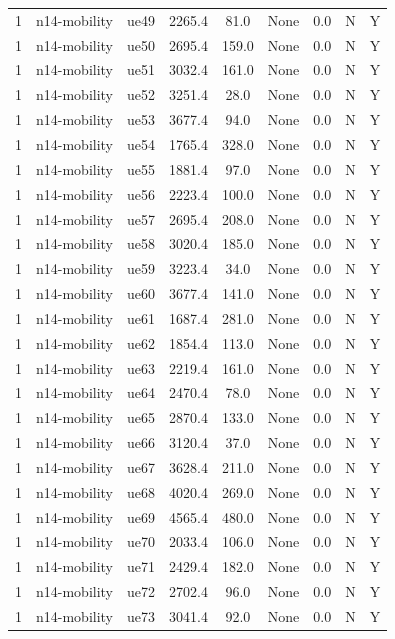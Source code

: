 \begin{table}[ht]
\begin{tabular}{|c|c|c|c|c|c|c|c|c|}
1 & n14-mobility & ue49 & 2265.4 & 81.0 & None & 0.0 & N & Y \\
1 & n14-mobility & ue50 & 2695.4 & 159.0 & None & 0.0 & N & Y \\
1 & n14-mobility & ue51 & 3032.4 & 161.0 & None & 0.0 & N & Y \\
1 & n14-mobility & ue52 & 3251.4 & 28.0 & None & 0.0 & N & Y \\
1 & n14-mobility & ue53 & 3677.4 & 94.0 & None & 0.0 & N & Y \\
1 & n14-mobility & ue54 & 1765.4 & 328.0 & None & 0.0 & N & Y \\
1 & n14-mobility & ue55 & 1881.4 & 97.0 & None & 0.0 & N & Y \\
1 & n14-mobility & ue56 & 2223.4 & 100.0 & None & 0.0 & N & Y \\
1 & n14-mobility & ue57 & 2695.4 & 208.0 & None & 0.0 & N & Y \\
1 & n14-mobility & ue58 & 3020.4 & 185.0 & None & 0.0 & N & Y \\
1 & n14-mobility & ue59 & 3223.4 & 34.0 & None & 0.0 & N & Y \\
1 & n14-mobility & ue60 & 3677.4 & 141.0 & None & 0.0 & N & Y \\
1 & n14-mobility & ue61 & 1687.4 & 281.0 & None & 0.0 & N & Y \\
1 & n14-mobility & ue62 & 1854.4 & 113.0 & None & 0.0 & N & Y \\
1 & n14-mobility & ue63 & 2219.4 & 161.0 & None & 0.0 & N & Y \\
1 & n14-mobility & ue64 & 2470.4 & 78.0 & None & 0.0 & N & Y \\
1 & n14-mobility & ue65 & 2870.4 & 133.0 & None & 0.0 & N & Y \\
1 & n14-mobility & ue66 & 3120.4 & 37.0 & None & 0.0 & N & Y \\
1 & n14-mobility & ue67 & 3628.4 & 211.0 & None & 0.0 & N & Y \\
1 & n14-mobility & ue68 & 4020.4 & 269.0 & None & 0.0 & N & Y \\
1 & n14-mobility & ue69 & 4565.4 & 480.0 & None & 0.0 & N & Y \\
1 & n14-mobility & ue70 & 2033.4 & 106.0 & None & 0.0 & N & Y \\
1 & n14-mobility & ue71 & 2429.4 & 182.0 & None & 0.0 & N & Y \\
1 & n14-mobility & ue72 & 2702.4 & 96.0 & None & 0.0 & N & Y \\
1 & n14-mobility & ue73 & 3041.4 & 92.0 & None & 0.0 & N & Y \\

\end{tabular}
\end{table}
